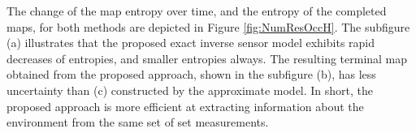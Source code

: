\documentclass[letterpaper, 10pt, conference]{ieeeconf}
\begin{document}
The change of the map entropy over time, and the entropy of the completed maps, for both methods are depicted in Figure \ref{fig:NumResOccH}. The subfigure (a) illustrates that the proposed exact inverse sensor model exhibits rapid decreases of entropies, and smaller entropies always. The resulting terminal map obtained from the proposed approach, shown in the subfigure (b), has less uncertainty than (c) constructed by the approximate model. In short, the proposed approach is more efficient at extracting information about the environment from the same set of set measurements. 

\end{document}
